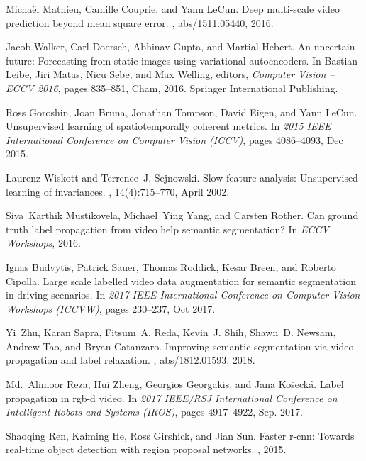 \documentclass{article}
\begin{document}
{\begin{thebibliography}{10}
Micha{\"e}l Mathieu, Camille Couprie, and Yann LeCun.
\newblock Deep multi-scale video prediction beyond mean square error.
, abs/1511.05440, 2016.

Jacob Walker, Carl Doersch, Abhinav Gupta, and Martial Hebert.
\newblock An uncertain future: Forecasting from static images using variational
  autoencoders.
\newblock In Bastian Leibe, Jiri Matas, Nicu Sebe, and Max Welling, editors,
  {\em Computer Vision -- ECCV 2016}, pages 835--851, Cham, 2016. Springer
  International Publishing.

Ross Goroshin, Joan Bruna, Jonathan Tompson, David Eigen, and Yann LeCun.
\newblock Unsupervised learning of spatiotemporally coherent metrics.
\newblock In {\em 2015 IEEE International Conference on Computer Vision
  (ICCV)}, pages 4086--4093, Dec 2015.

Laurenz Wiskott and Terrence~J. Sejnowski.
\newblock Slow feature analysis: Unsupervised learning of invariances.
, 14(4):715--770, April 2002.

Siva~Karthik Mustikovela, Michael~Ying Yang, and Carsten Rother.
\newblock Can ground truth label propagation from video help semantic
  segmentation?
\newblock In {\em ECCV Workshops}, 2016.

Ignas Budvytis, Patrick Sauer, Thomas Roddick, Kesar Breen, and Roberto
  Cipolla.
\newblock Large scale labelled video data augmentation for semantic
  segmentation in driving scenarios.
\newblock In {\em 2017 IEEE International Conference on Computer Vision
  Workshops (ICCVW)}, pages 230--237, Oct 2017.

Yi~Zhu, Karan Sapra, Fitsum~A. Reda, Kevin~J. Shih, Shawn~D. Newsam, Andrew
  Tao, and Bryan Catanzaro.
\newblock Improving semantic segmentation via video propagation and label
  relaxation.
, abs/1812.01593, 2018.

Md.~Alimoor Reza, Hui Zheng, Georgios Georgakis, and Jana Košecká.
\newblock Label propagation in rgb-d video.
\newblock In {\em 2017 IEEE/RSJ International Conference on Intelligent Robots
  and Systems (IROS)}, pages 4917--4922, Sep. 2017.

Shaoqing Ren, Kaiming He, Ross Girshick, and Jian Sun.
\newblock Faster r-cnn: Towards real-time object detection with region proposal
  networks.
, 2015.


\end{thebibliography}}
\end{document}
